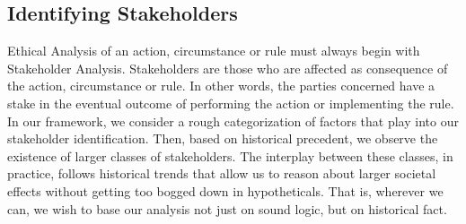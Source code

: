 \subsection{Identifying Stakeholders}
\label{sec:-identify}
Ethical Analysis of an action, circumstance or rule must always begin 
with Stakeholder Analysis. Stakeholders are those who are affected as 
consequence of the action, circumstance or rule. In other words, the 
parties concerned have a stake in the eventual outcome of performing 
the action or implementing the rule.  In our framework, we consider 
a rough categorization of factors that play into our stakeholder 
identification.  Then, based on historical precedent, we observe the 
existence of larger classes of stakeholders. The interplay between 
these classes, in practice, follows historical trends that allow us 
to reason about larger societal effects without getting too bogged 
down in hypotheticals.  That is, wherever we can, we wish to base our 
analysis not just on sound logic, but on historical fact.

